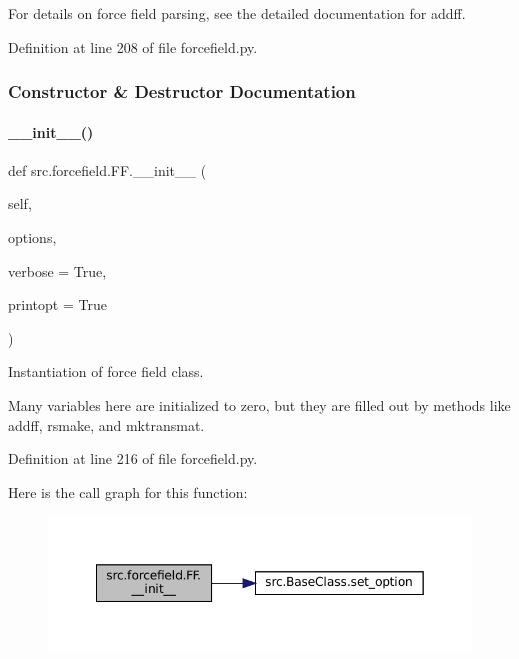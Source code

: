 For details on force field parsing, see the detailed documentation for addff. 

Definition at line 208 of file forcefield.\+py.



\subsubsection{Constructor \& Destructor Documentation}
\mbox{\label{classsrc_1_1forcefield_1_1FF_a612049f6ab09b343948bd372914b47d2}} 
\paragraph{\texorpdfstring{\+\_\+\+\_\+init\+\_\+\+\_\+()}{\_\_init\_\_()}}
{\footnotesize\ttfamily def src.\+forcefield.\+F\+F.\+\_\+\+\_\+init\+\_\+\+\_\+ (\begin{DoxyParamCaption}\item[{}]{self,  }\item[{}]{options,  }\item[{}]{verbose = {\ttfamily True},  }\item[{}]{printopt = {\ttfamily True} }\end{DoxyParamCaption})}



Instantiation of force field class. 

Many variables here are initialized to zero, but they are filled out by methods like addff, rsmake, and mktransmat. 

Definition at line 216 of file forcefield.\+py.

Here is the call graph for this function\+:
\nopagebreak
\begin{figure}[H]
\begin{center}
\leavevmode
\includegraphics[width=349pt]{classsrc_1_1forcefield_1_1FF_a612049f6ab09b343948bd372914b47d2_cgraph}
\end{center}
\end{figure}


